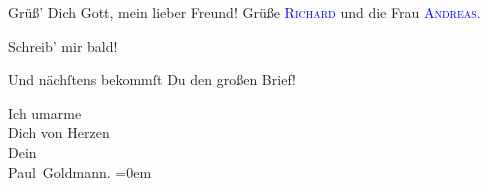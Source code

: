 \pstart
           Grüß’ Dich Gott, mein lieber Freund! Grüße \textsc{\textcolor{blue}{Richard}{}\ledrightnote{\textcolor{blue}{Richard Beer-Hofmann}}} und die Frau \textsc{\textcolor{blue}{Andreas}{}\ledrightnote{\textcolor{blue}{Lou Andreas-Salomé}}}.\pend
           
\pstart
           Schreib’ mir bald!\pend
           
\pstart
           Und nächſtens bekommſt Du den großen Brief!\pend
           
\pstart
           Ich umarme {\\[\baselineskip]}Dich von Herzen {\\[\baselineskip]}Dein {\\[\baselineskip]}\spacefill\mbox{Paul Goldmann.}\pend
           \leftskip=0em{}\endnumbering{}  
      